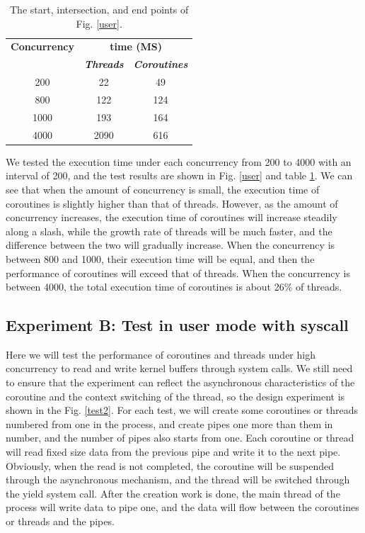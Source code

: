 \documentclass[conference]{IEEEtran}
\begin{document}
\begin{table}[htbp]
\caption{The start, intersection, and end points of Fig. \ref{user}.}
\begin{center}
\begin{tabular}{|c|c|c|}
\hline
\textbf{Concurrency}&\multicolumn{2}{|c|}{\textbf{time (MS)}} \\
\cline{2-3} 
\textbf{} & \textbf{\textit{Threads}}& \textbf{\textit{Coroutines}} \\
\hline
200 & 22 & 49 \\
  800 & 122 & 124 \\
  1000 & 193 & 164 \\
  4000 & 2090 & 616 \\
\hline
\end{tabular}
\label{tab:Experiment A}
\end{center}
\end{table}

We tested the execution time under each concurrency from 200 to 4000 with an interval of 200, and the test results are shown in Fig. \ref{user} and table \ref{tab:Experiment A}. We can see that when the amount of concurrency is small, the execution time of coroutines is slightly higher than that of threads. However, as the amount of concurrency increases, the execution time of coroutines will increase steadily along a slash, while the growth rate of threads will be much faster, and the difference between the two will gradually increase. When the concurrency is between 800 and 1000, their execution time will be equal, and then the performance of coroutines will exceed that of threads. When the concurrency is between 4000, the total execution time of coroutines is about 26\% of threads.

\subsection{Experiment B: Test in user mode with syscall}

Here we will test the performance of coroutines and threads under high concurrency to read and write kernel buffers through system calls. We still need to ensure that the experiment can reflect the asynchronous characteristics of the coroutine and the context switching of the thread, so the design experiment is shown in the Fig. \ref{test2}. For each test, we will create some coroutines or threads numbered from one in the process, and create pipes one more than them in number, and the number of pipes also starts from one. Each coroutine or thread will read fixed size data from the previous pipe and write it to the next pipe. Obviously, when the read is not completed, the coroutine will be suspended through the asynchronous mechanism, and the thread will be switched through the yield system call. After the creation work is done, the main thread of the process will write data to pipe one, and the data will flow between the coroutines or threads and the pipes.
\end{document}
